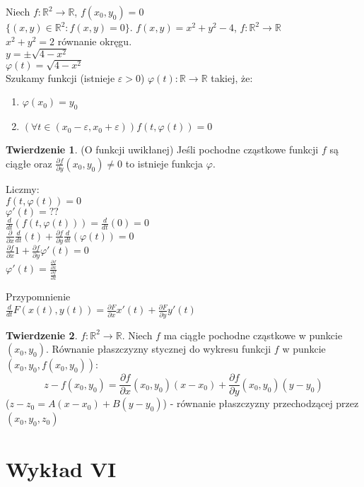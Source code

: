 \documentclass{article}
\theoremstyle{definition}
\theoremstyle{definition}
\newtheorem{tw}{Twierdzenie}[subsection]
\theoremstyle{definition}
\theoremstyle{definition}
\begin{document}
Niech $f: \mathbb{R}^2\rightarrow\mathbb{R}$, $f(x_0,y_0)=0$\\
$\{(x,y)\in\mathbb{R}^2 : f(x,y)=0\}$. $f(x,y)=x^2+y^2-4$, $f:\mathbb{R}^2\rightarrow \mathbb{R}$\\
$x^2+y^2=2$ równanie okręgu.\\
$y=\pm \sqrt{4-x^2}$\\
$\varphi(t)=\sqrt{4-x^2}$\\
Szukamy funkcji (istnieje $\varepsilon > 0$)
$\varphi(t): \mathbb{R}\rightarrow\mathbb{R}$ takiej, że:
\begin{enumerate}
    \item $\varphi(x_0) = y_0$
    \item $\left(\forall t\in(x_0 - \varepsilon, x_0 + \varepsilon)\right) f(t,\varphi(t))=0$
\end{enumerate}

\begin{tw}
    (O funkcji uwikłanej) Jeśli pochodne cząstkowe funkcji $f$ są ciągłe oraz $\frac{\partial f}{\partial y} (x_0,y_0) \neq 0$ to istnieje funkcja $\varphi$.
\end{tw}
Liczmy:\\
$f(t,\varphi(t)) = 0$\\
$\varphi'(t)=??$\\
$\frac{d}{dt} \left(f(t,\varphi(t)) \right) = \frac{d}{dt} (0) = 0$\\
$\frac{\partial}{\partial x} \frac{d}{dt} (t) + \frac{\partial f}{\partial y} \frac{d}{dt} (\varphi(t)) = 0$\\
$\frac{\partial f}{\partial x} 1 + \frac{\partial f}{\partial y} \varphi'(t)= 0$\\
$\varphi'(t) = \frac{\frac{\partial f}{\partial x}}{\frac{\partial f}{\partial x}}$

Przypomnienie\\
$\frac{d}{dt} F(x(t),y(t)) = \frac{\partial F}{\partial x} x'(t) + \frac{\partial F}{\partial y} y'(t)$

\begin{tw}
    $f: \mathbb{R}^2 \rightarrow \mathbb{R}$. Niech $f$ ma ciągłe pochodne cząstkowe w punkcie $(x_0,y_0)$. Równanie płaszczyzny
    stycznej do wykresu funkcji $f$ w punkcie $(x_0,y_0,f(x_0,y_0))$:
    \[z-f(x_0,y_0)=\frac{\partial f}{\partial x} (x_0,y_0) (x-x_0) + \frac{\partial f}{\partial y} (x_0,y_0) (y-y_0)\]
    ($z-z_0=A(x-x_0)+B(y-y_0)$) - równanie płaszczyzny przechodzącej przez $(x_0,y_0,z_0)$
\end{tw}

\section{Wykład VI}
\end{document}
